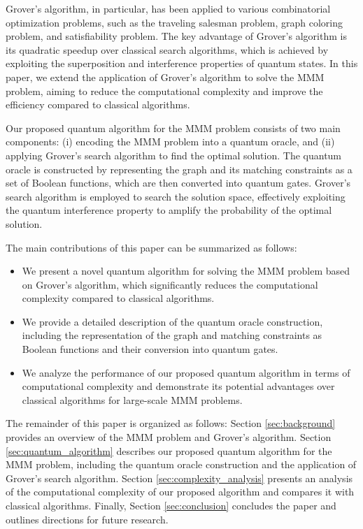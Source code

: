 Grover's algorithm, in particular, has been applied to various combinatorial optimization problems, such as the traveling salesman problem, graph coloring problem, and satisfiability problem. The key advantage of Grover's algorithm is its quadratic speedup over classical search algorithms, which is achieved by exploiting the superposition and interference properties of quantum states. In this paper, we extend the application of Grover's algorithm to solve the MMM problem, aiming to reduce the computational complexity and improve the efficiency compared to classical algorithms.

Our proposed quantum algorithm for the MMM problem consists of two main components: (i) encoding the MMM problem into a quantum oracle, and (ii) applying Grover's search algorithm to find the optimal solution. The quantum oracle is constructed by representing the graph and its matching constraints as a set of Boolean functions, which are then converted into quantum gates. Grover's search algorithm is employed to search the solution space, effectively exploiting the quantum interference property to amplify the probability of the optimal solution.

The main contributions of this paper can be summarized as follows:

\begin{itemize}
    \item We present a novel quantum algorithm for solving the MMM problem based on Grover's algorithm, which significantly reduces the computational complexity compared to classical algorithms.
    \item We provide a detailed description of the quantum oracle construction, including the representation of the graph and matching constraints as Boolean functions and their conversion into quantum gates.
    \item We analyze the performance of our proposed quantum algorithm in terms of computational complexity and demonstrate its potential advantages over classical algorithms for large-scale MMM problems.
\end{itemize}

The remainder of this paper is organized as follows: Section \ref{sec:background} provides an overview of the MMM problem and Grover's algorithm. Section \ref{sec:quantum_algorithm} describes our proposed quantum algorithm for the MMM problem, including the quantum oracle construction and the application of Grover's search algorithm. Section \ref{sec:complexity_analysis} presents an analysis of the computational complexity of our proposed algorithm and compares it with classical algorithms. Finally, Section \ref{sec:conclusion} concludes the paper and outlines directions for future research.

